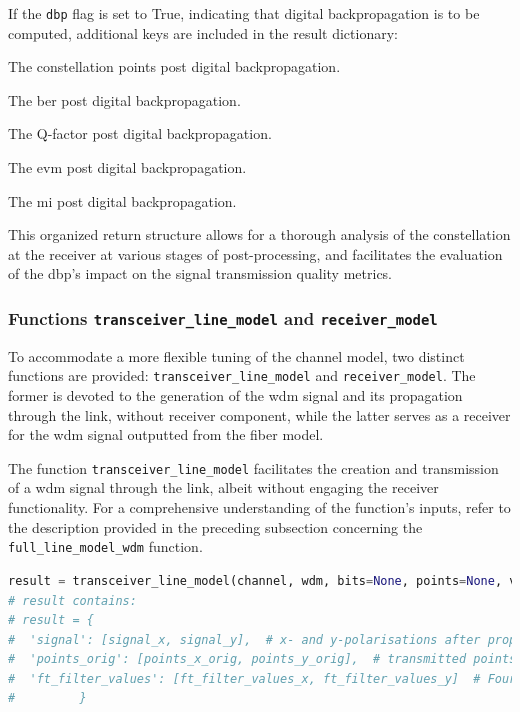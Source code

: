 If the \texttt{dbp} flag is set to True, indicating that digital backpropagation is to be computed, additional keys are included in the result dictionary:

\begin{description}[style=multiline, leftmargin=4cm, font=\normalfont]
    \item[\texttt{points\_dbp}] The constellation points post digital backpropagation.
    \item[\texttt{ber\_dbp}] The \acrshort{ber} post digital backpropagation.
    \item[\texttt{q\_dbp}] The Q-factor post digital backpropagation.
    \item[\texttt{evm\_dbp}] The \acrshort{evm} post digital backpropagation.
    \item[\texttt{mi\_dbp}] The \acrshort{mi} post digital backpropagation.
\end{description}

This organized return structure allows for a thorough analysis of the constellation at the receiver at various stages of post-processing, and facilitates the evaluation of the \Gls{dbp}'s impact on the signal transmission quality metrics.


\subsubsection{Functions \texttt{transceiver\_line\_model} and \texttt{receiver\_model}}
To accommodate a more flexible tuning of the channel model, two distinct functions are provided: \texttt{transceiver\_line\_model} and \texttt{receiver\_model}. The former is devoted to the generation of the \acrshort{wdm} signal and its propagation through the link, without receiver component, while the latter serves as a receiver for the \acrshort{wdm} signal outputted from the fiber model.

The function \texttt{transceiver\_line\_model} facilitates the creation and transmission of a \acrshort{wdm} signal through the link, albeit without engaging the receiver functionality. For a comprehensive understanding of the function's inputs, refer to the description provided in the preceding subsection concerning the \texttt{full\_line\_model\_wdm} function.

\begin{lstlisting}[language=Python, caption=Usage of \texttt{transceiver\_line\_model} function, label=lst:tx_line_model]
result = transceiver_line_model(channel, wdm, bits=None, points=None, verbose=0, dbp=False, ft_filter_values_tx=None)
# result contains:
# result = {
#  'signal': [signal_x, signal_y],  # x- and y-polarisations after propagation
#  'points_orig': [points_x_orig, points_y_orig],  # transmitted points for x- and y-
#  'ft_filter_values': [ft_filter_values_x, ft_filter_values_y]  # Fourier coefficients for filter used to create WDM signal for x- and y-
#         }
\end{lstlisting}

